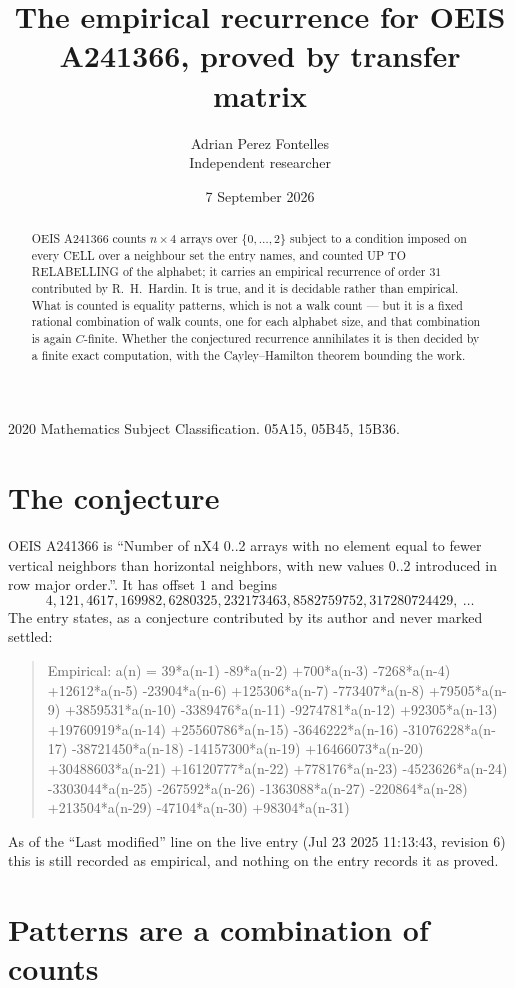 \documentclass[11pt,a4paper]{article}
\title{The empirical recurrence for OEIS A241366, proved by transfer matrix}
\author{Adrian Perez Fontelles\\ \small Independent researcher}
\date{7 September 2026}
\theoremstyle{plain}
\theoremstyle{definition}
\begin{document}
\maketitle

\begin{abstract}
OEIS A241366 counts $n\times4$ arrays over $\{0,\dots,2\}$ subject to a condition imposed on
every CELL over a neighbour set the entry names, and counted UP TO RELABELLING of the
alphabet; it carries an empirical recurrence of order $31$ contributed by
R.~H.~Hardin. It is true, and it is decidable rather than empirical. What is counted is
equality patterns, which is not a walk count --- but it is a fixed rational combination of
walk counts, one for each alphabet size, and that combination is again $C$-finite. Whether the
conjectured recurrence annihilates it is then decided by a finite exact computation, with the
Cayley--Hamilton theorem bounding the work.
\end{abstract}

\noindent\small 2020 Mathematics Subject Classification. 05A15, 05B45, 15B36.\normalsize

\section{The conjecture}

OEIS A241366 is ``Number of nX4 0..2 arrays with no element equal to fewer vertical neighbors than horizontal neighbors, with new values 0..2 introduced in row major order.''. It has offset $1$ and begins
\[
4, 121, 4617, 169982, 6280325, 232173463, 8582759752, 317280724429,\ \dots
\]
The entry states, as a conjecture contributed by its author and never marked settled:
\begin{quote}
Empirical: a(n) = 39*a(n-1) -89*a(n-2) +700*a(n-3) -7268*a(n-4) +12612*a(n-5) -23904*a(n-6) +125306*a(n-7) -773407*a(n-8) +79505*a(n-9) +3859531*a(n-10) -3389476*a(n-11) -9274781*a(n-12) +92305*a(n-13) +19760919*a(n-14) +25560786*a(n-15) -3646222*a(n-16) -31076228*a(n-17) -38721450*a(n-18) -14157300*a(n-19) +16466073*a(n-20) +30488603*a(n-21) +16120777*a(n-22) +778176*a(n-23) -4523626*a(n-24) -3303044*a(n-25) -267592*a(n-26) -1363088*a(n-27) -220864*a(n-28) +213504*a(n-29) -47104*a(n-30) +98304*a(n-31)
\end{quote}
As of the ``Last modified'' line on the live entry (Jul 23 2025 11:13:43, revision 6) this is still
recorded as empirical, and nothing on the entry records it as proved.

\section{Patterns are a combination of counts}
\end{document}
